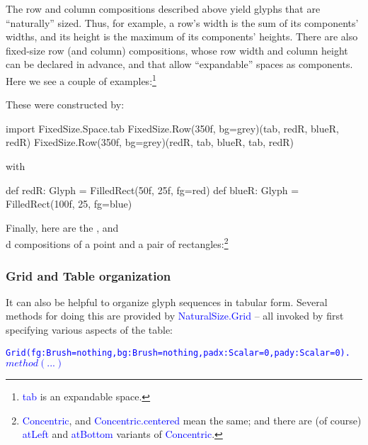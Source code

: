 \documentclass[12pt,a4paper]{article}
\def\Scala#1{\textcolor{blue}{\textsf{#1}}}
\def\SSS#1{\subsubsection*{#1}}
\begin{document}
The row and column compositions described above yield glyphs that
are ``naturally'' sized. Thus, for example, a row's width is the
sum of its components' widths, and its height is the maximum of its
components' heights. There are also fixed-size row (and column)
compositions, whose row width and column height can be declared in advance,
and that allow ``expandable'' spaces as components. Here we see a couple of examples:\footnote{\Scala{tab} is
an expandable space.}

\begin{center}
\quad\quad
{}
\end{center}

These were constructed by:
\begin{scala}
import FixedSize.Space.tab
FixedSize.Row(350f, bg=grey)(tab, redR, blueR, redR)
FixedSize.Row(350f, bg=grey)(redR, tab, blueR, tab, redR)
\end{scala}
with
\begin{scala}
def redR:  Glyph = FilledRect(50f, 25f, fg=red)
def blueR: Glyph = FilledRect(100f, 25, fg=blue)
\end{scala}

Finally, here are the ,
 and \\d{}
compositions of a point and a pair of rectangles:\footnote{\Scala{Concentric}, and
\Scala{Concentric.centered} mean the same;
and there are (of course) \Scala{atLeft} and \Scala{atBottom} variants
of \Scala{Concentric}.}


\begin{center}
\quad\quad
{}
\quad\quad
{} 
\end{center}



\clearpage
\SSS{Grid and Table organization}
It can also be helpful to organize glyph sequences in tabular
form. Several methods for doing
this are provided by \Scala{NaturalSize.Grid} --
all invoked by first specifying various aspects of the table:

\begin{alltt}\textcolor{blue}{Grid(fg: Brush=nothing, bg: Brush=nothing, padx: Scalar=0, pady: Scalar=0).\(method(...)\)}
\end{alltt}
\end{document}
